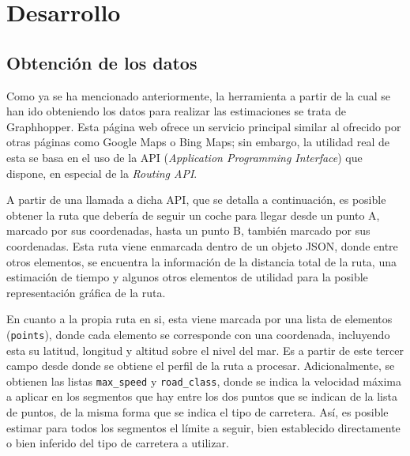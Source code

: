 \documentclass[11pt,spanish,listoffigures,listoftables]{tfgetsinf}
\begin{document}

\chapter{Desarrollo}
\section{Obtención de los datos}
Como ya se ha mencionado anteriormente, la herramienta a partir de la cual se han ido obteniendo los datos para realizar las estimaciones se trata de Graphhopper. Esta página web ofrece un servicio principal similar al ofrecido por otras páginas como Google Maps o Bing Maps; sin embargo, la utilidad real de esta se basa en el uso de la API (\textit{Application Programming Interface}) que dispone, en especial de la \textit{Routing API}.

A partir de una llamada a dicha API, que se detalla a continuación, es posible obtener la ruta que debería de seguir un coche para llegar desde un punto A, marcado por sus coordenadas, hasta un punto B, también marcado por sus coordenadas. Esta ruta viene enmarcada dentro de un objeto JSON, donde entre otros elementos, se encuentra la información de la distancia total de la ruta, una estimación de tiempo y algunos otros elementos de utilidad para la posible representación gráfica de la ruta.

En cuanto a la propia ruta en si, esta viene marcada por una lista de elementos (\verb|points|), donde cada elemento se corresponde con una coordenada, incluyendo esta su latitud, longitud y altitud sobre el nivel del mar. Es a partir de este tercer campo desde donde se obtiene el perfil de la ruta a procesar. Adicionalmente, se obtienen las listas \verb|max_speed| y \verb|road_class|, donde se indica la velocidad máxima a aplicar en los segmentos que hay entre los dos puntos que se indican de la lista de puntos, de la misma forma que se indica el tipo de carretera. Así, es posible estimar para todos los segmentos el límite a seguir, bien establecido directamente o bien inferido del tipo de carretera a utilizar.
\end{document}
